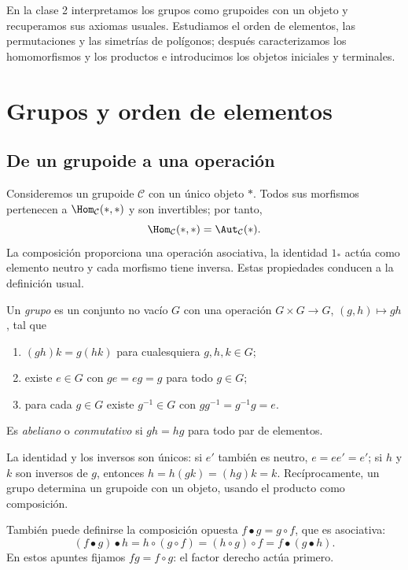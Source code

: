 En la clase 2 interpretamos los grupos como grupoides con un objeto y recuperamos sus axiomas usuales. Estudiamos el orden de elementos, las permutaciones y las simetrías de polígonos; después caracterizamos los homomorfismos y los productos e introducimos los objetos iniciales y terminales.

\section{Grupos y orden de elementos}
\subsection{De un grupoide a una operación}
Consideremos un grupoide $\mathcal C$ con un único objeto $*$. Todos sus morfismos pertenecen a $\Hom_{\mathcal C}(*,*)$ y son invertibles; por tanto,
\[
\Hom_{\mathcal C}(*,*)=\Aut_{\mathcal C}(*).
\]
La composición proporciona una operación asociativa, la identidad $1_*$ actúa como elemento neutro y cada morfismo tiene inversa. Estas propiedades conducen a la definición usual.

\begin{defi}
Un \emph{grupo} es un conjunto no vacío $G$ con una operación $G\times G\to G$, $(g,h)\mapsto gh$, tal que
\begin{enumerate}[label=\roman*)]
\item $(gh)k=g(hk)$ para cualesquiera $g,h,k\in G$;
\item existe $e\in G$ con $ge=eg=g$ para todo $g\in G$;
\item para cada $g\in G$ existe $g^{-1}\in G$ con $gg^{-1}=g^{-1}g=e$.
\end{enumerate}
Es \emph{abeliano} o \emph{conmutativo} si $gh=hg$ para todo par de elementos.
\end{defi}
La identidad y los inversos son únicos: si $e'$ también es neutro, $e=ee'=e'$; si $h$ y $k$ son inversos de $g$, entonces $h=h(gk)=(hg)k=k$. Recíprocamente, un grupo determina un grupoide con un objeto, usando el producto como composición.

\begin{obs}
También puede definirse la composición opuesta $f\mathbin{\bullet}g=g\circ f$, que es asociativa:
\[
(f\mathbin{\bullet}g)\mathbin{\bullet}h
=h\circ(g\circ f)=(h\circ g)\circ f
=f\mathbin{\bullet}(g\mathbin{\bullet}h).
\]
En estos apuntes fijamos $fg=f\circ g$: el factor derecho actúa primero.
\end{obs}


